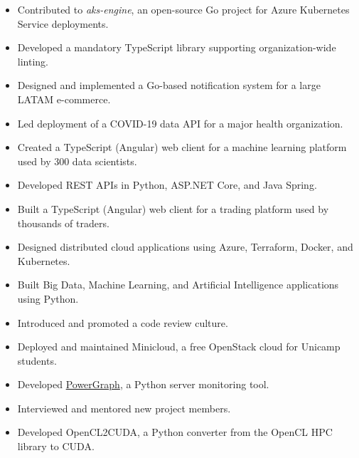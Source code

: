 \documentclass[10pt, a4paper, roman]{moderncv} %
\begin{document}
{
    \begin{itemize}
        \item Contributed to \textit{aks-engine}, an open-source Go project for Azure Kubernetes Service deployments.
        \item Developed a mandatory TypeScript library supporting organization-wide linting.
        \item Designed and implemented a Go-based notification system for a large LATAM e-commerce.
        \item Led deployment of a COVID-19 data API for a major health organization.
    \end{itemize}
}

{
    \begin{itemize}
        \item Created a TypeScript (Angular) web client for a machine learning platform used by 300 data scientists.
        \item Developed REST APIs in Python, ASP.NET Core, and Java Spring.
        \item Built a TypeScript (Angular) web client for a trading platform used by thousands of traders.
        \item Designed distributed cloud applications using Azure, Terraform, Docker, and Kubernetes.
    \end{itemize}
}

{
    \begin{itemize}
        \item Built Big Data, Machine Learning, and Artificial Intelligence applications using Python.
        \item Introduced and promoted a code review culture.
    \end{itemize}
}

{
    \begin{itemize}
        \item Deployed and maintained Minicloud, a free OpenStack cloud for Unicamp students.
        \item Developed \href{https://github.com/Guilhermeslucas/powergraph}{PowerGraph}, a Python server monitoring tool.
        \item Interviewed and mentored new project members.
        \item Developed OpenCL2CUDA, a Python converter from the OpenCL HPC library to CUDA.
    \end{itemize}
}
\end{document}
